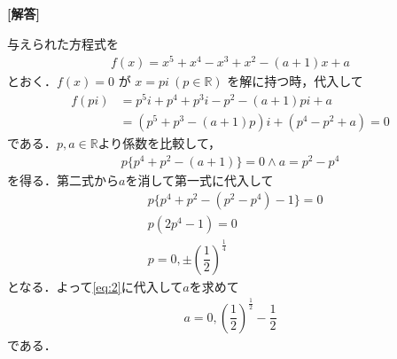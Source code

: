 \documentclass[../../main.tex]{subfiles}
\begin{document}
\begin{oframed}
  
\end{oframed}

{\bf [解答]}

与えられた方程式を
\begin{align}
  f(x) = x^5+x^4-x^3+x^2-(a+1)x+a \label{eq:1}
\end{align}
とおく．$f(x)=0$ が $x = pi \ (p \in \mathbb{R})$ を解に持つ時，代入して
\begin{align}
  f(pi)
  &= p^5 i + p^4 + p^3 i - p^2 - (a+1)pi + a \\
  &= (p^5+p^3-(a+1)p) i + (p^4-p^2+a) = 0
\end{align}
である．$p, a \in \mathbb{R}$より係数を比較して，
\begin{align}
  p\{p^4+p^2-(a+1)\} = 0 \land a = p^2-p^4 \label{eq:2}
\end{align}
を得る．第二式から$a$を消して第一式に代入して
\begin{align}
  & p \{ p^4+p^2-(p^2-p^4)-1 \} = 0 \\
  & p (2p^4-1) = 0 \\
  & p = 0, \pm \left(\dfrac{1}{2}\right)^{\frac{1}{4}}
\end{align}
となる．よって\cref{eq:2}に代入して$a$を求めて
\begin{align}
  a = 0, \left(\dfrac{1}{2}\right)^{\frac{1}{2}} - \dfrac{1}{2}
\end{align}
である．
\end{document}
